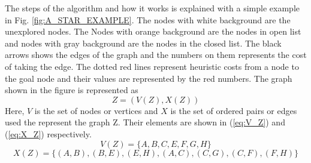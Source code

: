The steps of the algorithm and how it works is explained with a simple example in Fig. \ref{fig:A_STAR_EXAMPLE}. The nodes with white background are the unexplored nodes. The Nodes with orange background are the nodes in open list and nodes with gray background are the nodes in the closed list. The black arrows shows the edges of the graph and the numbers on them represents the cost of taking the edge. The dotted red lines represent heuristic costs from a node to the goal node and their values are represented by the red numbers. The graph shown in the figure is represented as
\begin{equation}
    Z = ( V(Z), X(Z) )
\end{equation}
Here, $V$ is the set of nodes or vertices and $X$ is the set of ordered pairs or edges used the represent the graph Z. Their elements are shown in (\ref{eq:V_Z}) and (\ref{eq:X_Z}) respectively.
\begin{equation}
\label{eq:V_Z}
    V(Z) = \{A,B,C,E,F,G,H\}
\end{equation}
\begin{equation}
\label{eq:X_Z}
    X(Z) = \{ (A,B), (B,E), (E,H), (A,C), (C,G), (C,F), (F,H) \}
\end{equation}

